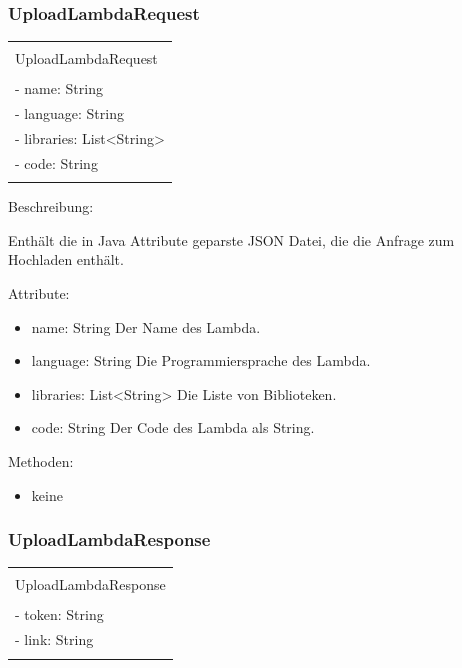 \documentclass[a4paper,20pt,oneside]{book}
\begin{document}
	\subsubsection{UploadLambdaRequest}
		\centering
	\begin{tabular}{|l|}
	\hline \\
	UploadLambdaRequest\\
	\hline \\
	- name: String\\	
    - language: String\\    
    - libraries: List<String>\\    
    - code: String\\
    \hline \\
	\hline 
	\end{tabular}
	
	
	\vspace{0.5cm}
	\raggedright
	
	Beschreibung:	
	
	Enthält die in Java Attribute geparste JSON Datei, die die Anfrage zum Hochladen enthält.
	\vspace{0.5cm}
	
	Attribute:
	\begin{itemize}
	\item name: String\linebreak
	Der Name des Lambda.	
	\item language: String\linebreak
	Die Programmiersprache des Lambda.	
	\item libraries: List<String>\linebreak	
	Die Liste von Biblioteken.
	\item code: String\linebreak
	Der Code des Lambda als String.	
	\end{itemize}
	
	Methoden:
	\begin{itemize}
	\item keine
	\end{itemize}
	\subsubsection{UploadLambdaResponse}
		\centering
	\begin{tabular}{|l|}
	\hline \\
	UploadLambdaResponse\\
	\hline \\
	- token: String\\	
	- link: String\\
    \hline \\
	\hline 
	\end{tabular}
	
\end{document}

